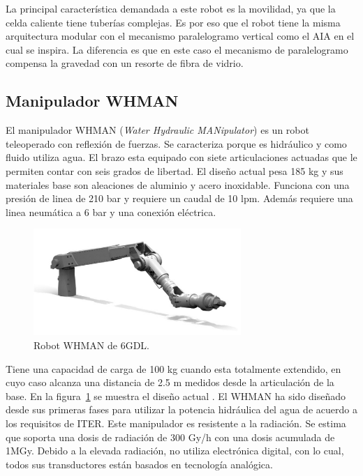 La principal característica demandada a este robot es la movilidad, ya que la celda caliente tiene tuberías complejas.
Es por eso que el robot tiene la misma arquitectura modular con el mecanismo paralelogramo vertical como el AIA en el cual se inspira. La diferencia es que en este caso el mecanismo de paralelogramo compensa la gravedad con un resorte de fibra de vidrio.

\subsection*{Manipulador WHMAN}
El manipulador WHMAN (\textit{Water Hydraulic MANipulator}) \cite{Nieminen2009} es un robot teleoperado con reflexión de fuerzas. Se caracteriza porque es hidráulico y como fluido utiliza agua. El brazo esta equipado con siete articulaciones actuadas que le permiten contar con seis grados de libertad. El diseño actual pesa 185 kg y sus materiales base son aleaciones de aluminio y acero inoxidable. Funciona con una presión de linea de 210 bar y requiere un caudal de 10 lpm. Además requiere una linea neumática a 6 bar y una conexión eléctrica.

\begin{figure}[htbp] 
   \centering
   \includegraphics[width=0.7\textwidth]{FiguresSoA/WHMAN}
   \caption{Robot WHMAN de 6GDL.}
   \label{fig:WHMAN} 
\end{figure}

Tiene una capacidad de carga de 100 kg cuando esta totalmente extendido, en cuyo caso alcanza una distancia de 2.5 m medidos desde la articulación de la base. En la figura~\ref{fig:WHMAN} se muestra el diseño actual \cite{Nieminen2009}.
El WHMAN ha sido diseñado desde sus primeras fases para utilizar la potencia hidráulica del agua de acuerdo a los requisitos de ITER. Este manipulador es resistente a la radiación. Se estima que soporta una dosis de radiación de 300 Gy/h con una dosis acumulada de 1MGy. Debido a la elevada radiación, no utiliza electrónica digital, con lo cual, todos sus transductores est\'an basados en tecnología analógica.

